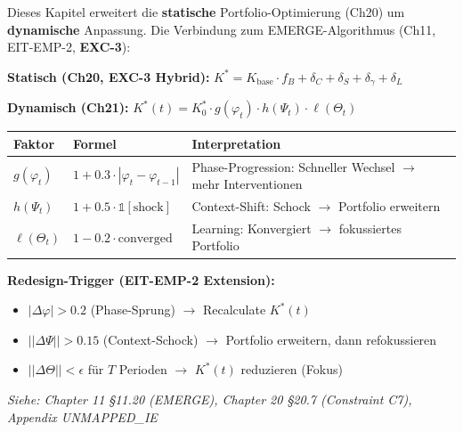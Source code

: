 
\begin{tcolorbox}[colback=blue!5!white, colframe=blue!75!black,
    title=\textbf{Cross-Reference: EMERGE Algorithm \& Dynamic $K^*(t)$ (Chapter 11, 20)}]

Dieses Kapitel erweitert die \textbf{statische} Portfolio-Optimierung (Ch20) um \textbf{dynamische} Anpassung. Die Verbindung zum EMERGE-Algorithmus (Ch11, EIT-EMP-2, \textbf{EXC-3}):

\vspace{0.2cm}
\textbf{Statisch (Ch20, EXC-3 Hybrid):} $K^* = K_{\text{base}} \cdot f_B + \delta_C + \delta_S + \delta_\gamma + \delta_L$

\textbf{Dynamisch (Ch21):} $K^*(t) = K^*_0 \cdot g(\varphi_t) \cdot h(\Psi_t) \cdot \ell(\Theta_t)$

\vspace{0.2cm}
\begin{tabular}{@{}p{3cm}p{4cm}p{5.5cm}@{}}
\textbf{Faktor} & \textbf{Formel} & \textbf{Interpretation} \\
\hline
$g(\varphi_t)$ & $1 + 0.3 \cdot |\varphi_t - \varphi_{t-1}|$ & Phase-Progression: Schneller Wechsel $\to$ mehr Interventionen \\
$h(\Psi_t)$ & $1 + 0.5 \cdot \mathbb{1}[\text{shock}]$ & Context-Shift: Schock $\to$ Portfolio erweitern \\
$\ell(\Theta_t)$ & $1 - 0.2 \cdot \text{converged}$ & Learning: Konvergiert $\to$ fokussiertes Portfolio \\
\end{tabular}

\vspace{0.2cm}
\textbf{Redesign-Trigger (EIT-EMP-2 Extension):}
\begin{itemize}[nosep]
\item $|\Delta\varphi| > 0.2$ (Phase-Sprung) $\to$ Recalculate $K^*(t)$
\item $||\Delta\Psi|| > 0.15$ (Context-Schock) $\to$ Portfolio erweitern, dann refokussieren
\item $||\Delta\Theta|| < \epsilon$ für $T$ Perioden $\to$ $K^*(t)$ reduzieren (Fokus)
\end{itemize}

\vspace{0.2cm}
\textit{Siehe: Chapter 11 §11.20 (EMERGE), Chapter 20 §20.7 (Constraint C7), Appendix UNMAPPED_IE}
\end{tcolorbox}

